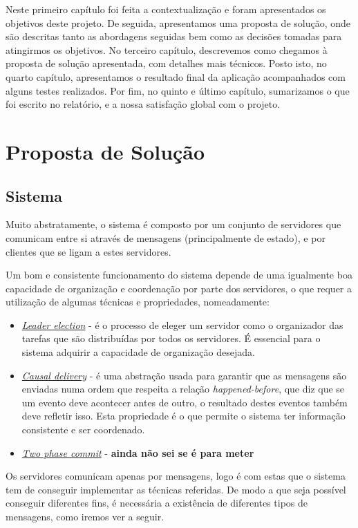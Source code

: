 \documentclass[12pt, a4paper]{report}
\begin{document}
Neste primeiro capítulo foi feita a contextualização e foram apresentados os objetivos deste projeto.
De seguida, apresentamos uma proposta de solução, onde são descritas tanto as abordagens seguidas bem como as decisões tomadas para atingirmos os objetivos.
No terceiro capítulo, descrevemos como chegamos à proposta de solução apresentada, com detalhes mais técnicos.
Posto isto, no quarto capítulo, apresentamos o resultado final da aplicação acompanhados com alguns testes realizados.
Por fim, no quinto e último capítulo, sumarizamos o que foi escrito no relatório, e a nossa satisfação global com o projeto.


\chapter{Proposta de Solução}
\section{Sistema}
Muito abstratamente, o sistema é composto por um conjunto de servidores que comunicam entre si através de mensagens (principalmente de estado), e por clientes que se ligam a estes servidores.

Um bom e consistente funcionamento do sistema depende de uma igualmente boa capacidade de organização e coordenação por parte dos servidores, o que requer a utilização de algumas técnicas e propriedades, nomeadamente:

\begin{itemize}
    \item \underline{\textit{Leader election}} - é o processo de eleger um servidor como o organizador das tarefas que são distribuídas por todos os servidores. É essencial para o sistema adquirir a capacidade de organização desejada.
    \item \underline{\textit{Causal delivery}} - é uma abstração usada para garantir que as mensagens são enviadas numa ordem que respeita a relação \textit{happened-before}, que diz que se um evento deve acontecer antes de outro, o resultado destes eventos também deve refletir isso. Esta propriedade é o que permite o sistema ter informação consistente e ser coordenado.
    \item \underline{\textit{Two phase commit}} - \textbf{ainda não sei se é para meter}
\end{itemize}

Os servidores comunicam apenas por mensagens, logo é com estas que o sistema tem de conseguir implementar as técnicas referidas. De modo a que seja possível conseguir diferentes fins, é necessária a existência de diferentes tipos de mensagens, como iremos ver a seguir.
\end{document}
